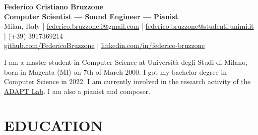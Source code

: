 \documentclass[a4paper,9pt]{extarticle}
\begin{document}
\pagestyle{empty}

\newcommand{\aladdin}{\href{https://aladdin.di.unimi.it/}{ALaDDIn}}
\newcommand{\bebrasit}{\href{https://bebras.it/}{italian website}}
\newcommand{\bebrasint}{\href{https://www.bebras.org/}{international website}}

\newcommand{\limlab}{\href{https://www.lim.di.unimi.it/}{LIM Lab}}
\newcommand{\ieeeofnn}{\href{https://ieee1599.lim.di.unimi.it/}{IEEE 1599}}

\newcommand{\adaptlab}{\href{https://cazzola.di.unimi.it/adapt-lab.html}{ADAPT Lab}}

\newcommand{\neverlang}{\href{https://www.sciencedirect.com/science/article/pii/S1477842415000056}{Neverlang}}
\newcommand{\golang}{\href{https://golang.org/}{GoLang}}
\newcommand{\python}{\href{https://www.python.org/}{Python}}
\newcommand{\numpy}{\href{https://numpy.org/}{NumPy}}
\newcommand{\pandas}{\href{https://pandas.pydata.org/}{Pandas}}

\newcommand{\believe}{\href{https://www.believemusic.com/}{Believe}}
\newcommand{\siae}{\href{https://www.siae.it/}{SIAE}}

\begin{center}
\textbf{\Large Federico Cristiano Bruzzone}\\[3pt] %
\textbf{Computer Scientist --- Sound Engineer --- Pianist}\\[1pt] %
Milan, Italy |
\href{mailto:federico.bruzzone.i@gmail.com}{federico.bruzzone.i@gmail.com} |
\href{mailto:federico.bruzzone@studenti.unimi.it}{federico.bruzzone@studenti.unimi.it} |
(+39) 3917369214
\\
\href{https://github.com/FedericoBruzzone}{github.com/FedericoBruzzone} |
\href{https://www.linkedin.com/in/federico-bruzzone}{linkedin.com/in/federico-bruzzone}
\end{center}

\begin{center}
I am a master student in Computer Science at Università degli Studi di Milano, born in Magenta (MI) on 7th of March 2000. I got my bachelor degree in Computer Science in 2022. I am currently involved in the research activity of the \adaptlab. I am also a pianist and composer.\\
\end{center}


\section*{EDUCATION}
\end{document}
